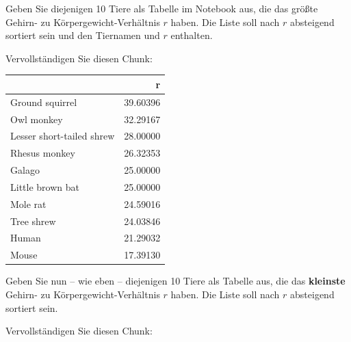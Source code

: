 \documentclass[
]{article}
\newenvironment{Shaded}{\begin{snugshade}}{\end{snugshade}}
\newcommand{\AttributeTok}[1]{\textcolor[rgb]{0.77,0.63,0.00}{#1}}
\newcommand{\CommentTok}[1]{\textcolor[rgb]{0.56,0.35,0.01}{\textit{#1}}}
\newcommand{\DecValTok}[1]{\textcolor[rgb]{0.00,0.00,0.81}{#1}}
\newcommand{\FunctionTok}[1]{\textcolor[rgb]{0.00,0.00,0.00}{#1}}
\newcommand{\NormalTok}[1]{#1}
\newcommand{\OtherTok}[1]{\textcolor[rgb]{0.56,0.35,0.01}{#1}}
\newcommand{\SpecialCharTok}[1]{\textcolor[rgb]{0.00,0.00,0.00}{#1}}
\begin{document}
Geben Sie diejenigen 10 Tiere als Tabelle im Notebook aus, die das
größte Gehirn- zu Körpergewicht-Verhältnis \(r\) haben. Die Liste soll
nach \(r\) absteigend sortiert sein und den Tiernamen und \(r\)
enthalten.

Vervollständigen Sie diesen Chunk:

\begin{Shaded}
\end{Shaded}

\begin{longtable}[]{@{}lr@{}}
\toprule()
& r \\
\midrule()
\endhead
Ground squirrel & 39.60396 \\
Owl monkey & 32.29167 \\
Lesser short-tailed shrew & 28.00000 \\
Rhesus monkey & 26.32353 \\
Galago & 25.00000 \\
Little brown bat & 25.00000 \\
Mole rat & 24.59016 \\
Tree shrew & 24.03846 \\
Human & 21.29032 \\
Mouse & 17.39130 \\
\bottomrule()
\end{longtable}

Geben Sie nun -- wie eben -- diejenigen 10 Tiere als Tabelle aus, die
das \textbf{kleinste} Gehirn- zu Körpergewicht-Verhältnis \(r\) haben.
Die Liste soll nach \(r\) absteigend sortiert sein.

Vervollständigen Sie diesen Chunk:

\begin{Shaded}
\end{Shaded}
\end{document}

